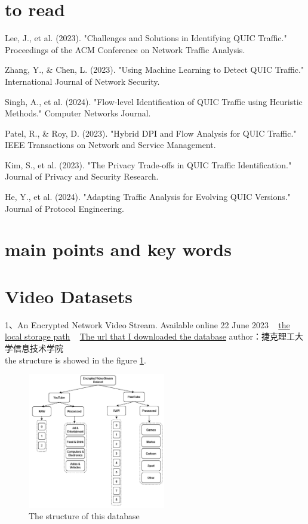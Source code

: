 \documentclass[a4paper, 10pt]{article}
\begin{document}
\section{to read}

Lee, J., et al. (2023). "Challenges and Solutions in Identifying QUIC Traffic." Proceedings of the ACM Conference on Network Traffic Analysis.

Zhang, Y., \& Chen, L. (2023). "Using Machine Learning to Detect QUIC Traffic." International Journal of Network Security.

Singh, A., et al. (2024). "Flow-level Identification of QUIC Traffic using Heuristic Methods." Computer Networks Journal.

Patel, R., \& Roy, D. (2023). "Hybrid DPI and Flow Analysis for QUIC Traffic." IEEE Transactions on Network and Service Management.

Kim, S., et al. (2023). "The Privacy Trade-offs in QUIC Traffic Identification." Journal of Privacy and Security Research.

He, Y., et al. (2024). "Adapting Traffic Analysis for Evolving QUIC Versions." Journal of Protocol Engineering.

\section*{main points and key words}




\section{Video Datasets}

1、An Encrypted Network Video Stream.
Available online 22 June 2023 	~
\href{file://D:/database/envsds/envsds.zip}{the local storage path} ~
\href{https://zenodo.org/records/8039729/files/envsds.zip?download=1}{The url that I downloaded the database}
author：捷克理工大学信息技术学院\\
the structure is showed in the figure \ref{fig:database1}.

\begin{figure}[ht]
	\centering
	\begin{minipage}{0.5\textwidth}%
		\includegraphics[width=6cm]{database1.jpg}
		\caption{The structure of this database}
		\label{fig:database1}
	\end{minipage}
\end{figure}
\end{document}
